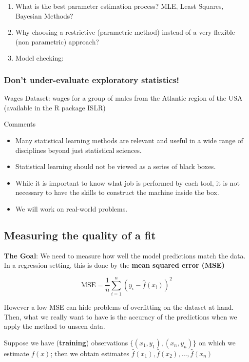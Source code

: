 \documentclass[11pt]{article}
\begin{document}
\begin{enumerate}
    \item What is the best parameter estimation process? MLE, Least Squares, Bayesian Methods?
    \item Why choosing a restrictive (parametric method) instead of a very flexible (non parametric) approach?
    \item Model checking:
\end{enumerate}

\subsubsection{Don't under-evaluate exploratory statistics!}
Wages Dataset: wages for a group of males from the Atlantic region of the USA (available in the R package ISLR)

Comments
\begin{itemize}
    \item Many statistical learning methods are relevant and useful in a wide range of disciplines beyond just statistical sciences.
    \item Statistical learning should not be viewed as a series of black boxes.
    \item While it is important to know what job is performed by each tool, it is not necessary to have the skills to construct the machine inside the box.
    \item We will work on real-world problems.
\end{itemize}

\subsection{Measuring the quality of a fit}
\textbf{The Goal}: We need to measure how well the model predictions match the data. In a regression setting, this is done by the \textbf{mean squared error (MSE)}

\begin{equation}
    \text{MSE} = \frac{1}{n} \sum_{i=1}^{n} (y_i - \hat{f}(x_i))^2
\end{equation}

However a low MSE can hide problems of overfitting on the dataset at hand. Then, what we really want to have is the accuracy of the predictions when we apply the method to unseen data.

Suppose we have (\textbf{training}) observations \(\{ (x_1, y_1), (x_n, y_n) \}\) on which we estimate $f(x)$; then we obtain estimates $\hat{f}(x_1), \hat{f}(x_2), \dots, \hat{f} (x_n)$
\end{document}

